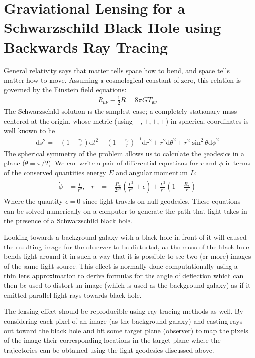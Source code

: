 \documentclass{article}
\begin{document}
\section*{Graviational Lensing for a Schwarzschild Black Hole using Backwards Ray Tracing}
	General relativity says that matter tells space how to bend, and space tells matter how to move. Assuming a cosmological constant of zero, this relation is governed by the Einstein field equations:
	\begin{align}
		R_{\mu\nu}-\frac{1}{2}R=8\pi G T_{\mu\nu}
	\end{align}
	The Schwarzschild solution is the simplest case; a completely stationary mass centered at the origin, whose metric (using \(-,+,+,+\)) in spherical coordinates is well known to be
	\begin{align}
		\mathrm{d}s^{2}=-\left(1-\frac{r_{s}}{r}\right)\mathrm{d}t^{2}+\left(1-\frac{r_{s}}{r}\right)^{-1}\mathrm{d}r^{2}+r^{2}\mathrm{d}\theta^{2}+r^{2}\sin^{2}\theta\mathrm{d}\phi^{2}
	\end{align}
	The spherical symmetry of the problem allows us to calculate the geodesics in a plane (\(\theta=\pi/2\)). We can write a pair of differential equations for \(r\) and \(\phi\) in terms of the conserved quantities energy \(E\) and angular momentum \(L\):
	\begin{align} \label{eq:eom}
		\begin{aligned}
			\dot{\phi}&=\frac{L}{r^{2}}, & \ddot{r}&=-\frac{R_{s}}{2r^{2}}\left(\frac{L^{2}}{r^{2}}+\epsilon\right)+\frac{L^{2}}{r^{3}}\left(1-\frac{R_{s}}{r}\right)
		\end{aligned}
	\end{align}
	Where the quantity \(\epsilon=0\) since light travels on null geodesics. These equations can be solved numerically on a computer to generate the path that light takes in the presence of a Schwarzschild black hole. 
	
	Looking towards a background galaxy with a black hole in front of it will caused the resulting image for the observer to be distorted, as the mass of the black hole bends light around it in such a way that it is possible to see two (or more) images of the same light source. This effect is normally done computationally using a thin lens approximation to derive formulas for the angle of deflection which can then be used to distort an image (which is used as the background galaxy) as if it emitted parallel light rays towards black hole.
	
	The lensing effect should be reproducible using ray tracing methods as well. By considering each pixel of an image (as the background galaxy) and casting rays out toward the black hole and hit some target plane (observer) to map the pixels of the image their corresponding locations in the target plane where the trajectories can be obtained using the light geodesics discussed above.
	
\end{document}
